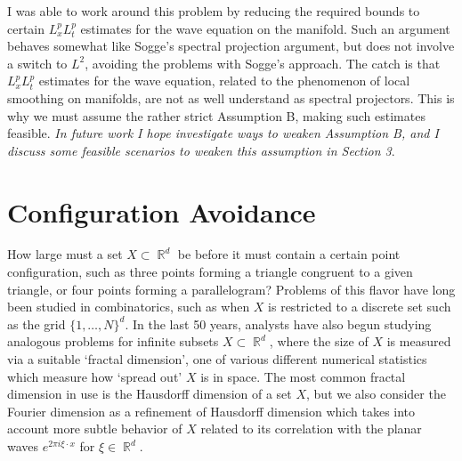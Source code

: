 \documentclass[11pt]{article}
\DeclareMathOperator{\RR}{\mathbb{R}}
\begin{document}
I was able to work around this problem by reducing the required bounds to certain $L^p_x L^p_t$ estimates for the wave equation on the manifold. Such an argument behaves somewhat like Sogge's spectral projection argument, but does not involve a switch to $L^2$, avoiding the problems with Sogge's approach. The catch is that $L^p_x L^p_t$ estimates for the wave equation, related to the phenomenon of local smoothing on manifolds, are not as well understand as spectral projectors. This is why we must assume the rather strict Assumption B, making such estimates feasible. \emph{In future work I hope investigate ways to weaken Assumption B, and I discuss some feasible scenarios to weaken this assumption in Section 3}.

\section{Configuration Avoidance} \label{Section2}

How large must a set $X \subset \RR^d$ be before it must contain a certain point configuration, such as three points forming a triangle congruent to a given triangle, or four points forming a parallelogram? Problems of this flavor have long been studied in combinatorics, such as when $X$ is restricted to a discrete set such as the grid $\{ 1, \dots, N \}^d$. In the last 50 years, analysts have also begun studying analogous problems for infinite subsets $X \subset \RR^d$, where the size of $X$ is measured via a suitable `fractal dimension', one of various different numerical statistics which measure how `spread out' $X$ is in space. The most common fractal dimension in use is the Hausdorff dimension of a set $X$, but we also consider the Fourier dimension as a refinement of Hausdorff dimension which takes into account more subtle behavior of $X$ related to its correlation with the planar waves $e^{2 \pi i \xi \cdot x}$ for $\xi \in \RR^d$. 
\end{document}
